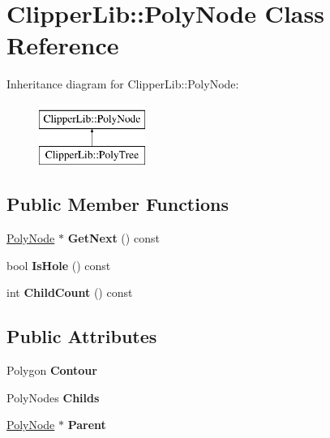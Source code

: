 \hypertarget{classClipperLib_1_1PolyNode}{\section{Clipper\-Lib\-:\-:Poly\-Node Class Reference}
\label{classClipperLib_1_1PolyNode}
}
Inheritance diagram for Clipper\-Lib\-:\-:Poly\-Node\-:\begin{figure}[H]
\begin{center}
\leavevmode
\includegraphics[height=2.000000cm]{classClipperLib_1_1PolyNode}
\end{center}
\end{figure}
\subsection*{Public Member Functions}
\begin{DoxyCompactItemize}
\item 
\hypertarget{classClipperLib_1_1PolyNode_ae9a4f50a1c9aec06c083578742d24bb7}{\hyperlink{classClipperLib_1_1PolyNode}{Poly\-Node} $\ast$ {\bfseries Get\-Next} () const }\label{classClipperLib_1_1PolyNode_ae9a4f50a1c9aec06c083578742d24bb7}

\item 
\hypertarget{classClipperLib_1_1PolyNode_aef7847f53087207b6e341c029adc1768}{bool {\bfseries Is\-Hole} () const }\label{classClipperLib_1_1PolyNode_aef7847f53087207b6e341c029adc1768}

\item 
\hypertarget{classClipperLib_1_1PolyNode_a76c8c55a45651cf3b5a67b8634173de8}{int {\bfseries Child\-Count} () const }\label{classClipperLib_1_1PolyNode_a76c8c55a45651cf3b5a67b8634173de8}

\end{DoxyCompactItemize}
\subsection*{Public Attributes}
\begin{DoxyCompactItemize}
\item 
\hypertarget{classClipperLib_1_1PolyNode_acb497b5e354eedbb5aa29531a1a57714}{Polygon {\bfseries Contour}}\label{classClipperLib_1_1PolyNode_acb497b5e354eedbb5aa29531a1a57714}

\item 
\hypertarget{classClipperLib_1_1PolyNode_a7ac59aea508951a4c979bfca8913261d}{Poly\-Nodes {\bfseries Childs}}\label{classClipperLib_1_1PolyNode_a7ac59aea508951a4c979bfca8913261d}

\item 
\hypertarget{classClipperLib_1_1PolyNode_a9465bc02623316de2af3ab52c6f7041e}{\hyperlink{classClipperLib_1_1PolyNode}{Poly\-Node} $\ast$ {\bfseries Parent}}\label{classClipperLib_1_1PolyNode_a9465bc02623316de2af3ab52c6f7041e}

\end{DoxyCompactItemize}
